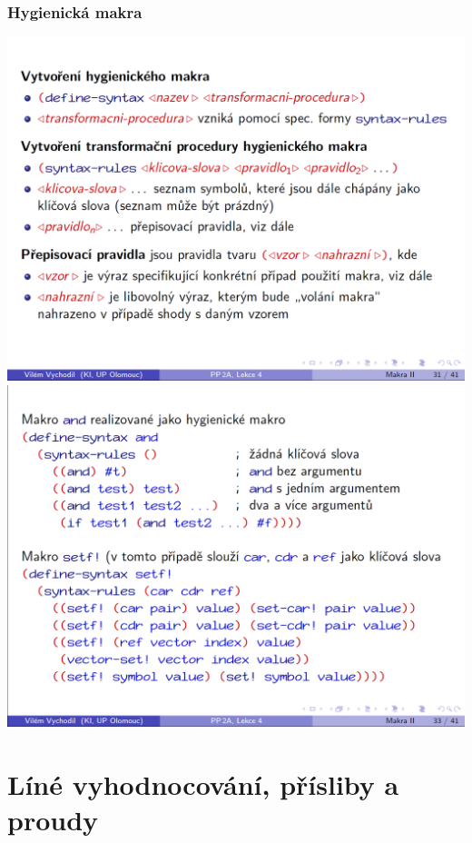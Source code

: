 \documentclass[10pt,a4paper]{article}
\begin{document}
\subsubsection{Hygienická makra}
\begin{center}
	\includegraphics[scale=0.35]{img/makra_hygienicka_pouziti_1}
	\includegraphics[scale=0.35]{img/makra_hygienicka_pouziti_2}
\end{center}

\section{Líné vyhodnocování, přísliby a proudy}
\end{document}
